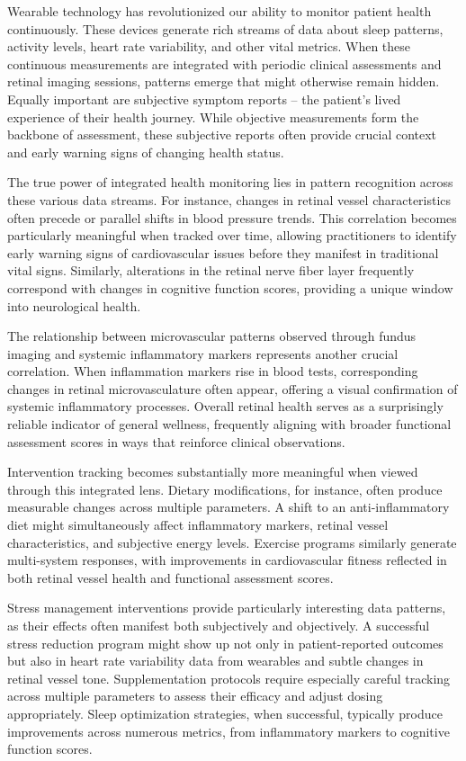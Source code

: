 \documentclass[
  Letterpaper,
]{scrbook}
\begin{document}
Wearable technology has revolutionized our ability to monitor patient
health continuously. These devices generate rich streams of data about
sleep patterns, activity levels, heart rate variability, and other vital
metrics. When these continuous measurements are integrated with periodic
clinical assessments and retinal imaging sessions, patterns emerge that
might otherwise remain hidden. Equally important are subjective symptom
reports -- the patient's lived experience of their health journey. While
objective measurements form the backbone of assessment, these subjective
reports often provide crucial context and early warning signs of
changing health status.

The true power of integrated health monitoring lies in pattern
recognition across these various data streams. For instance, changes in
retinal vessel characteristics often precede or parallel shifts in blood
pressure trends. This correlation becomes particularly meaningful when
tracked over time, allowing practitioners to identify early warning
signs of cardiovascular issues before they manifest in traditional vital
signs. Similarly, alterations in the retinal nerve fiber layer
frequently correspond with changes in cognitive function scores,
providing a unique window into neurological health.

The relationship between microvascular patterns observed through fundus
imaging and systemic inflammatory markers represents another crucial
correlation. When inflammation markers rise in blood tests,
corresponding changes in retinal microvasculature often appear, offering
a visual confirmation of systemic inflammatory processes. Overall
retinal health serves as a surprisingly reliable indicator of general
wellness, frequently aligning with broader functional assessment scores
in ways that reinforce clinical observations.

Intervention tracking becomes substantially more meaningful when viewed
through this integrated lens. Dietary modifications, for instance, often
produce measurable changes across multiple parameters. A shift to an
anti-inflammatory diet might simultaneously affect inflammatory markers,
retinal vessel characteristics, and subjective energy levels. Exercise
programs similarly generate multi-system responses, with improvements in
cardiovascular fitness reflected in both retinal vessel health and
functional assessment scores.

Stress management interventions provide particularly interesting data
patterns, as their effects often manifest both subjectively and
objectively. A successful stress reduction program might show up not
only in patient-reported outcomes but also in heart rate variability
data from wearables and subtle changes in retinal vessel tone.
Supplementation protocols require especially careful tracking across
multiple parameters to assess their efficacy and adjust dosing
appropriately. Sleep optimization strategies, when successful, typically
produce improvements across numerous metrics, from inflammatory markers
to cognitive function scores.
\end{document}
